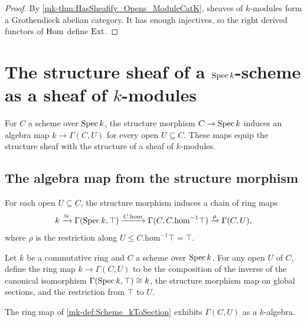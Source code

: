 \begin{proof}
  \leanok


By \ref{mk-thm:HasSheafify_Opens_ModuleCatK}, sheaves of \(k\)-modules form a Grothendieck abelian category. It has enough injectives, so the right derived functors of \(\operatorname{Hom}\) define \(\operatorname{Ext}\).
\end{proof}

\section{The structure sheaf of a \(\operatorname{Spec} k\)-scheme as a sheaf of \(k\)-modules}
\label{mk-sec:scheme_toModuleKSheaf}

For \(C\) a scheme over \(\operatorname{Spec} k\), the structure morphism \(C \to \operatorname{Spec} k\) induces an algebra map \(k \to \Gamma(C, U)\) for every open \(U \subseteq C\). These maps equip the structure sheaf with the structure of a sheaf of \(k\)-modules.

\subsection{The algebra map from the structure morphism}

For each open \(U \subseteq C\), the structure morphism induces a chain of ring maps
\[
  k \xrightarrow{\cong} \Gamma(\operatorname{Spec} k, \top) \xrightarrow{C.\mathrm{hom}} \Gamma(C, C.\mathrm{hom}^{-1}\top) \xrightarrow{\rho} \Gamma(C, U),
\]
where \(\rho\) is the restriction along \(U \le C.\mathrm{hom}^{-1}\top = \top\).

\begin{definition}\label{mk-def:Scheme_kToSection}
  \leanok


  Let \(k\) be a commutative ring and \(C\) a scheme over \(\operatorname{Spec} k\). For any open \(U\) of \(C\), define the ring map \(k \to \Gamma(C, U)\) to be the composition of the inverse of the canonical isomorphism \(\Gamma(\operatorname{Spec} k, \top) \cong k\), the structure morphism map on global sections, and the restriction from \(\top\) to \(U\).
\end{definition}

\begin{definition}\label{mk-def:Scheme_algebraSection}
  \leanok


  The ring map of \ref{mk-def:Scheme_kToSection} exhibits \(\Gamma(C, U)\) as a \(k\)-algebra.
\end{definition}

